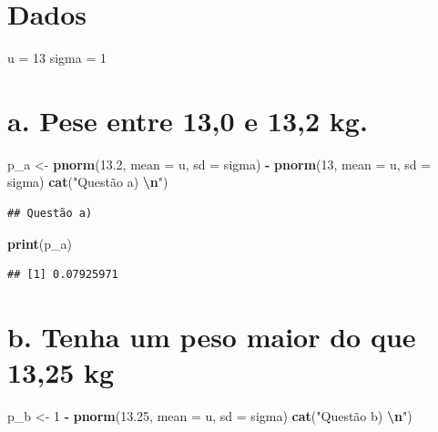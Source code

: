 \documentclass[
]{article}
\newenvironment{Shaded}{\begin{snugshade}}{\end{snugshade}}
\newcommand{\AttributeTok}[1]{\textcolor[rgb]{0.13,0.29,0.53}{#1}}
\newcommand{\DecValTok}[1]{\textcolor[rgb]{0.00,0.00,0.81}{#1}}
\newcommand{\FloatTok}[1]{\textcolor[rgb]{0.00,0.00,0.81}{#1}}
\newcommand{\FunctionTok}[1]{\textcolor[rgb]{0.13,0.29,0.53}{\textbf{#1}}}
\newcommand{\NormalTok}[1]{#1}
\newcommand{\OtherTok}[1]{\textcolor[rgb]{0.56,0.35,0.01}{#1}}
\newcommand{\SpecialCharTok}[1]{\textcolor[rgb]{0.81,0.36,0.00}{\textbf{#1}}}
\newcommand{\StringTok}[1]{\textcolor[rgb]{0.31,0.60,0.02}{#1}}
\begin{document}
\section{Dados}\label{dados-2}

\begin{Shaded}
\begin{Highlighting}[]
\NormalTok{u }\OtherTok{=} \DecValTok{13}
\NormalTok{sigma }\OtherTok{=} \DecValTok{1}
\end{Highlighting}
\end{Shaded}

\section{a. Pese entre 13,0 e 13,2
kg.}\label{a.-pese-entre-130-e-132-kg.}

\begin{Shaded}
\begin{Highlighting}[]
\NormalTok{p\_a }\OtherTok{\textless{}{-}} \FunctionTok{pnorm}\NormalTok{(}\FloatTok{13.2}\NormalTok{, }\AttributeTok{mean =}\NormalTok{ u, }\AttributeTok{sd =}\NormalTok{ sigma) }\SpecialCharTok{{-}} \FunctionTok{pnorm}\NormalTok{(}\DecValTok{13}\NormalTok{, }\AttributeTok{mean =}\NormalTok{ u, }\AttributeTok{sd =}\NormalTok{ sigma)}
\FunctionTok{cat}\NormalTok{(}\StringTok{"Questão a) }\SpecialCharTok{\textbackslash{}n}\StringTok{"}\NormalTok{)}
\end{Highlighting}
\end{Shaded}

\begin{verbatim}
## Questão a)
\end{verbatim}

\begin{Shaded}
\begin{Highlighting}[]
\FunctionTok{print}\NormalTok{(p\_a)}
\end{Highlighting}
\end{Shaded}

\begin{verbatim}
## [1] 0.07925971
\end{verbatim}

\section{b. Tenha um peso maior do que 13,25
kg}\label{b.-tenha-um-peso-maior-do-que-1325-kg}

\begin{Shaded}
\begin{Highlighting}[]
\NormalTok{p\_b }\OtherTok{\textless{}{-}} \DecValTok{1} \SpecialCharTok{{-}} \FunctionTok{pnorm}\NormalTok{(}\FloatTok{13.25}\NormalTok{, }\AttributeTok{mean =}\NormalTok{ u, }\AttributeTok{sd =}\NormalTok{ sigma)}
\FunctionTok{cat}\NormalTok{(}\StringTok{"Questão b) }\SpecialCharTok{\textbackslash{}n}\StringTok{"}\NormalTok{)}
\end{Highlighting}
\end{Shaded}
\end{document}
